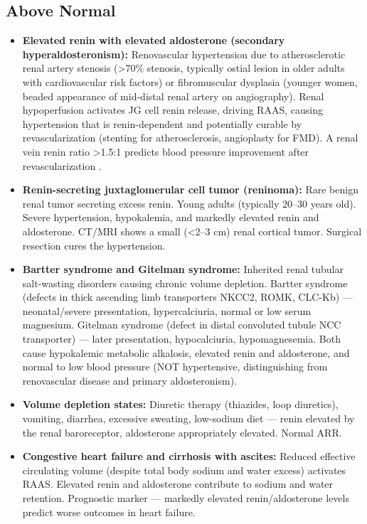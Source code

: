 \subsection*{Above Normal}
\begin{itemize}
  \item \textbf{Elevated renin with elevated aldosterone (secondary hyperaldosteronism):} Renovascular hypertension due to atherosclerotic renal artery stenosis (>70\% stenosis, typically ostial lesion in older adults with cardiovascular risk factors) or fibromuscular dysplasia (younger women, beaded appearance of mid-distal renal artery on angiography). Renal hypoperfusion activates JG cell renin release, driving RAAS, causing hypertension that is renin-dependent and potentially curable by revascularization (stenting for atherosclerosis, angioplasty for FMD). A renal vein renin ratio >1.5:1 predicts blood pressure improvement after revascularization \cite{rimoldi2014secondary}.
  \item \textbf{Renin-secreting juxtaglomerular cell tumor (reninoma):} Rare benign renal tumor secreting excess renin. Young adults (typically 20--30 years old). Severe hypertension, hypokalemia, and markedly elevated renin and aldosterone. CT/MRI shows a small (<2--3 cm) renal cortical tumor. Surgical resection cures the hypertension.
  \item \textbf{Bartter syndrome and Gitelman syndrome:} Inherited renal tubular salt-wasting disorders causing chronic volume depletion. Bartter syndrome (defects in thick ascending limb transporters NKCC2, ROMK, CLC-Kb) --- neonatal/severe presentation, hypercalciuria, normal or low serum magnesium. Gitelman syndrome (defect in distal convoluted tubule NCC transporter) --- later presentation, hypocalciuria, hypomagnesemia. Both cause hypokalemic metabolic alkalosis, elevated renin and aldosterone, and normal to low blood pressure (NOT hypertensive, distinguishing from renovascular disease and primary aldosteronism).
  \item \textbf{Volume depletion states:} Diuretic therapy (thiazides, loop diuretics), vomiting, diarrhea, excessive sweating, low-sodium diet --- renin elevated by the renal baroreceptor, aldosterone appropriately elevated. Normal ARR.
  \item \textbf{Congestive heart failure and cirrhosis with ascites:} Reduced effective circulating volume (despite total body sodium and water excess) activates RAAS. Elevated renin and aldosterone contribute to sodium and water retention. Prognostic marker --- markedly elevated renin/aldosterone levels predict worse outcomes in heart failure.

\end{itemize}

